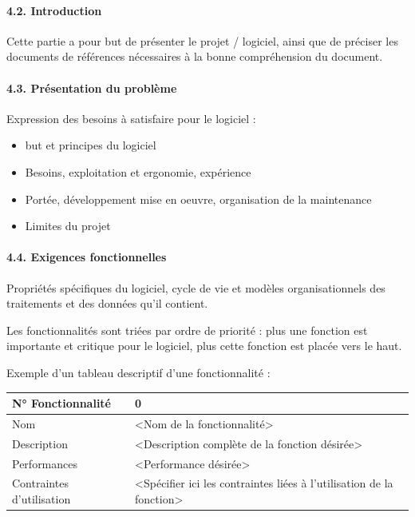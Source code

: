 \documentclass{article}
\begin{document}
\bigskip

\paragraph[4.2. Introduction]{4.2. Introduction}
Cette partie a pour but de présenter le projet / logiciel, ainsi que de
préciser les documents de références nécessaires à la bonne
compréhension du document.


\bigskip

\paragraph[4.3. Présentation du problème]{4.3. Présentation du problème}
Expression des besoins à satisfaire pour le logiciel :

\begin{itemize}
\item but et principes du logiciel
\item Besoins, exploitation et ergonomie, expérience
\item Portée, développement mise en oeuvre, organisation de la
maintenance
\item Limites du projet
\end{itemize}

\bigskip

\paragraph[4.4. Exigences fonctionnelles]{4.4. Exigences fonctionnelles}
Propriétés spécifiques du logiciel, cycle de vie et modèles
organisationnels des traitements et des données qu’il contient.


\bigskip

Les fonctionnalités sont triées par ordre de priorité : plus une
fonction est importante et critique pour le logiciel, plus cette
fonction est placée vers le haut.


\bigskip

Exemple d’un tableau descriptif d’une fonctionnalité :


\bigskip

\begin{flushleft}
\tablehead{}
\begin{supertabular}{|m{3.8219998cm}|m{12.324cm}|}
\hline
N° Fonctionnalité &
0\\\hline
Nom &
{\textless}Nom de la fonctionnalité{\textgreater}\\\hline
Description &
{\textless}Description complète de la fonction
désirée{\textgreater}\\\hline
Performances &
{\textless}Performance désirée{\textgreater}\\\hline
Contraintes d’utilisation &
{\textless}Spécifier ici les contraintes liées à l’utilisation de la
fonction{\textgreater}\\\hline
\end{supertabular}
\end{flushleft}
\end{document}
